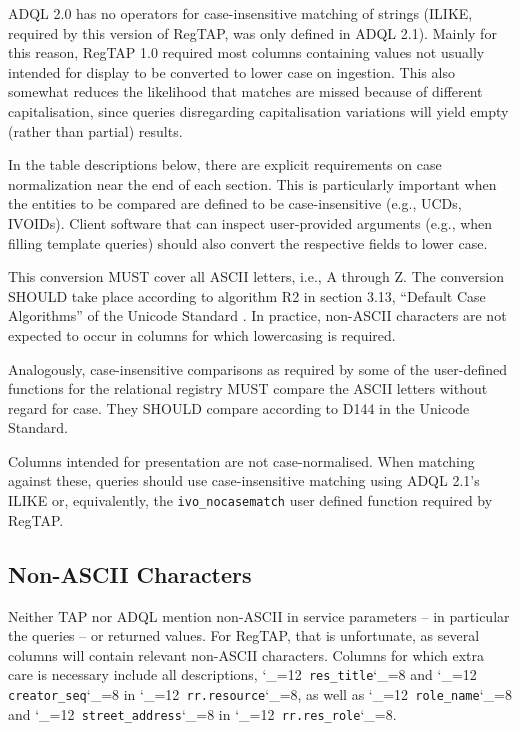 \documentclass[11pt,a4paper]{ivoa}
\makeatletter
\def\rtent#1{\texttt{\color{rtcolor}\verb|#1|}}
\def\makeunderscoreletter{\catcode`\_=12}
\def\makeunderscoresubscript{\catcode`\_=8}
\def\rtent{\makeunderscoreletter\relax\rt@nt}
\def\rt@nt#1{\texttt{\color{rtcolor} #1}\makeunderscoresubscript{}}
\makeatother
\begin{document}
\label{casenorm}

ADQL 2.0 has no operators for case-insensitive matching of strings
(ILIKE, required by this version of RegTAP, was only defined in ADQL
2.1).
Mainly for this reason, RegTAP 1.0 required most columns
containing values not usually intended for display to be
converted to lower case on ingestion.  This also somewhat reduces the
likelihood that matches are missed because of different capitalisation,
since queries disregarding capitalisation variations will yield empty
(rather than partial) results.

In the table descriptions below, there are
explicit requirements on case normalization near the end of each
section.  This is particularly important when the entities to be
compared are defined to be case-insensitive (e.g., UCDs, IVOIDs).
Client software that can inspect user-provided arguments (e.g., when
filling template queries) should also convert the respective fields to
lower case.

This conversion MUST cover all ASCII letters, i.e., A through Z.
The conversion SHOULD take place according to
algorithm R2 in section 3.13, ``Default Case Algorithms'' of the Unicode
Standard
\citep{std:UNICODE}.  In practice, non-ASCII characters are not expected
to occur in columns for which lowercasing is required.

Analogously, case-insensitive comparisons as required by some of the
user-defined functions for the relational registry MUST compare
the ASCII letters without regard for case.  They SHOULD compare according
to D144 in the Unicode Standard.

Columns intended for presentation are not case-normalised.  When
matching against these, queries should use case-insensitive matching
using ADQL 2.1's ILIKE or, equivalently, the \verb|ivo_nocasematch| user
defined function required by RegTAP.


\subsection{Non-ASCII Characters}

\label{utfreq}

Neither TAP nor ADQL mention non-ASCII in service parameters -- in
particular the queries -- or returned values.  For RegTAP, that is
unfortunate, as several columns will contain relevant non-ASCII
characters.  Columns for which extra care is necessary include all
descriptions, \rtent{res_title} and \rtent{creator_seq} in
\rtent{rr.resource}, as well as \rtent{role_name} and
\rtent{street_address} in \rtent{rr.res_role}.
\end{document}
